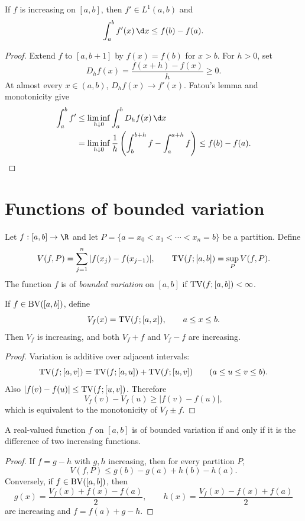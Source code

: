 \begin{cor}
If $f$ is increasing on $[a,b]$, then $f'\in L^1(a,b)$ and
\[
\int_a^b f'(x)\,\d x\leq f(b)-f(a).
\]
\end{cor}

\begin{proof}
Extend $f$ to $[a,b+1]$ by $f(x)=f(b)$ for $x>b$. For $h>0$, set
\[
D_hf(x)=\frac{f(x+h)-f(x)}h\geq0.
\]
At almost every $x\in(a,b)$, $D_hf(x)\to f'(x)$. Fatou's lemma and monotonicity give
\[
\begin{aligned}
\int_a^b f'
&\leq\liminf_{h\downarrow0}\int_a^bD_hf(x)\,\d x\\
&=\liminf_{h\downarrow0}\frac1h
 \left(\int_b^{b+h}f-\int_a^{a+h}f\right)
\leq f(b)-f(a).
\end{aligned}
\]
\end{proof}

\section{Functions of bounded variation}

\begin{de}[Variation]
Let $f:[a,b]\to\R$ and let $P=
\{a=x_0<x_1<\cdots<x_n=b\}$ be a partition. Define
\[
V(f,P)=\sum_{j=1}^n|f(x_j)-f(x_{j-1})|,
\qquad
\operatorname{TV}(f;[a,b])=\sup_PV(f,P).
\]
The function $f$ is of \emph{bounded variation} on $[a,b]$ if $\operatorname{TV}(f;[a,b])<\infty$.
\end{de}

\begin{prop}
If $f\in\operatorname{BV}([a,b])$, define
\[
V_f(x)=\operatorname{TV}(f;[a,x]),\qquad a\leq x\leq b.
\]
Then $V_f$ is increasing, and both $V_f+f$ and $V_f-f$ are increasing.
\end{prop}

\begin{proof}
Variation is additive over adjacent intervals:
\[
\operatorname{TV}(f;[a,v])=\operatorname{TV}(f;[a,u])+\operatorname{TV}(f;[u,v])
\qquad(a\leq u\leq v\leq b).
\]
Also $|f(v)-f(u)|\leq\operatorname{TV}(f;[u,v])$. Therefore
\[
V_f(v)-V_f(u)\geq |f(v)-f(u)|,
\]
which is equivalent to the monotonicity of $V_f\pm f$.
\end{proof}

\begin{thm}
A real-valued function $f$ on $[a,b]$ is of bounded variation if and only if it is the difference of two increasing functions.
\end{thm}

\begin{proof}
If $f=g-h$ with $g,h$ increasing, then for every partition $P$,
\[
V(f,P)\leq g(b)-g(a)+h(b)-h(a).
\]
Conversely, if $f\in\operatorname{BV}([a,b])$, then
\[
g(x)=\frac{V_f(x)+f(x)-f(a)}2,
\qquad
h(x)=\frac{V_f(x)-f(x)+f(a)}2
\]
are increasing and $f=f(a)+g-h$.
\end{proof}


